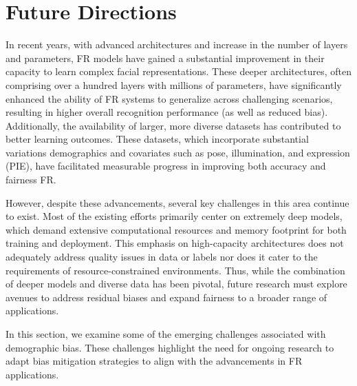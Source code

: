 \section{Future Directions}
\label{sec:future}

In recent years, with advanced architectures and increase in the number of
layers and parameters, FR models have gained a substantial improvement in their
capacity to learn complex facial representations. These deeper architectures,
often comprising over a hundred layers with millions of parameters, have
significantly enhanced the ability of FR systems to generalize across
challenging scenarios, resulting in higher overall recognition performance (as
well as reduced bias). Additionally, the availability of larger, more diverse
datasets has contributed to better learning outcomes. These datasets, which
incorporate substantial variations demographics and covariates such as pose,
illumination, and expression (PIE), have facilitated measurable progress in
improving both accuracy and fairness FR.

However, despite these advancements, several key challenges in this area
continue to exist. Most of the existing efforts primarily center on extremely
deep models, which demand extensive computational resources and memory footprint
for both training and deployment. This emphasis on high-capacity architectures
does not adequately address quality issues in data or labels nor does it cater
to the requirements of resource-constrained environments. Thus, while the
combination of deeper models and diverse data has been pivotal, future research
must explore avenues to address residual biases and expand fairness to a broader
range of applications.  

In this section, we examine some of the emerging challenges associated with
demographic bias. These challenges highlight the need for ongoing research to
adapt bias mitigation strategies to align with the advancements in FR
applications.\\


